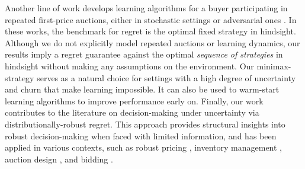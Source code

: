 Another line of work develops learning algorithms for a buyer participating in repeated first-price auctions, either in stochastic settings \citep{han2020optimal,balseiro2022contextual,badanidiyuru2023learning,schneider2024optimal} or adversarial ones \citep{han2020learning,zhang2022leveraging,kumar2024strategically}. In these works, the benchmark for regret is the optimal fixed strategy in hindsight. Although we do not explicitly model repeated auctions or learning dynamics, our results imply a regret guarantee against the optimal \emph{sequence of strategies} in hindsight without making any assumptions on the environment. Our minimax-strategy serves as a natural choice for settings with a high degree of uncertainty and churn that make learning impossible. It can also be used to warm-start learning algorithms to improve performance early on. Finally, our work contributes to the literature on decision-making under uncertainty via distributionally-robust regret. This approach provides structural insights into robust decision-making when faced with limited information, and has been applied in various contexts, such as robust pricing \citep{bergemann2011robust}, inventory management \citep{perakis2008regret}, auction design \citep{anunrojwong2022robustness, anunrojwong2023robust}, and bidding \citep{kasberger2023robust}.